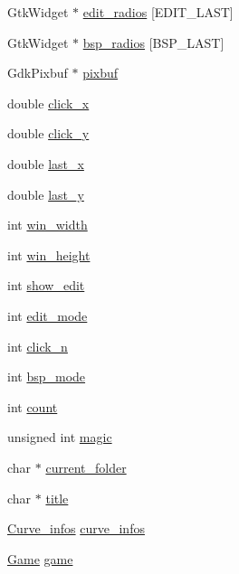 \begin{DoxyCompactItemize}
\item 
Gtk\+Widget $\ast$ \hyperlink{struct_mydata_afeceefa9528b56c22e00612af53c8272}{edit\+\_\+radios} \mbox{[}E\+D\+I\+T\+\_\+\+L\+A\+ST\mbox{]}
\item 
Gtk\+Widget $\ast$ \hyperlink{struct_mydata_af0129a7558616569b70f65f56fd2aed0}{bsp\+\_\+radios} \mbox{[}B\+S\+P\+\_\+\+L\+A\+ST\mbox{]}
\item 
Gdk\+Pixbuf $\ast$ \hyperlink{struct_mydata_a44cf4bc3a3a7376477b86bae6580de08}{pixbuf}
\item 
double \hyperlink{struct_mydata_a49a0f74fc7cb65d2a8ba39006d9e5056}{click\+\_\+x}
\item 
double \hyperlink{struct_mydata_ad50bebb00d8beaa505e312f9597a41a5}{click\+\_\+y}
\item 
double \hyperlink{struct_mydata_abb66b33c1e9a8a118c99e73d77ed512c}{last\+\_\+x}
\item 
double \hyperlink{struct_mydata_a58471f12beade2e129004d30fe0892c1}{last\+\_\+y}
\item 
int \hyperlink{struct_mydata_a3f05049836bf74dcfbc800d417bedec3}{win\+\_\+width}
\item 
int \hyperlink{struct_mydata_a043cefe0d8f27979f9813b61305f1407}{win\+\_\+height}
\item 
int \hyperlink{struct_mydata_ac21cca965335aa0a329dc6029f743542}{show\+\_\+edit}
\item 
int \hyperlink{struct_mydata_a7e53a3b3c1cac6e3afebd783728d232c}{edit\+\_\+mode}
\item 
int \hyperlink{struct_mydata_a4cbcc68b0a3ae7651f3363348f4d7456}{click\+\_\+n}
\item 
int \hyperlink{struct_mydata_a2a4a5364f7ffa17761866a77f6a54556}{bsp\+\_\+mode}
\item 
int \hyperlink{struct_mydata_ad43c3812e6d13e0518d9f8b8f463ffcf}{count}
\item 
unsigned int \hyperlink{struct_mydata_a7154179fe070a40c828f7c03f454d4d6}{magic}
\item 
char $\ast$ \hyperlink{struct_mydata_aecf8e6b88573cc04da63f47bfc13a246}{current\+\_\+folder}
\item 
char $\ast$ \hyperlink{struct_mydata_af06d911bb9e05f491ef3da520d03796c}{title}
\item 
\hyperlink{struct_curve__infos}{Curve\+\_\+infos} \hyperlink{struct_mydata_a917c9ea829deeac9d6a1c2309f76595b}{curve\+\_\+infos}
\item 
\hyperlink{struct_game}{Game} \hyperlink{struct_mydata_ac6a5ed6191fcf3a5bf0445921feb4f48}{game}
\end{DoxyCompactItemize}


